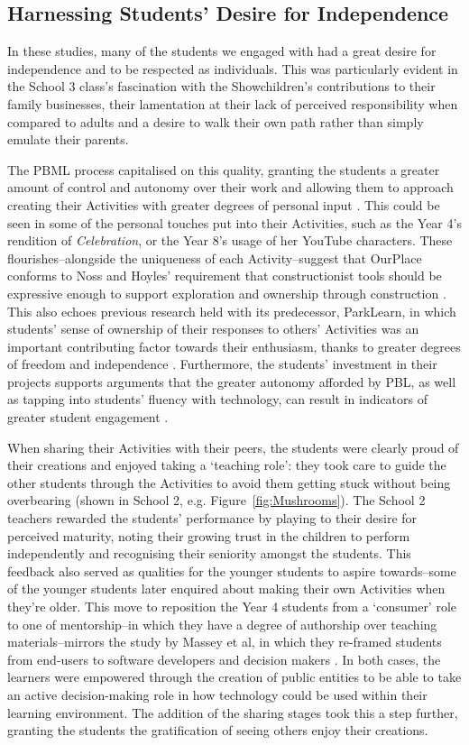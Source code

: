 \documentclass[,hyphens]{sigchi}
\begin{document}
\subsection{Harnessing Students' Desire for Independence}
In these studies, many of the students we engaged with had a great desire for independence and to be respected as individuals. This was particularly evident in the School 3 class's fascination with the Showchildren's contributions to their family businesses, their lamentation at their lack of perceived responsibility when compared to adults and a desire to walk their own path rather than simply emulate their parents.

The PBML process capitalised on this quality, granting the students a greater amount of control and autonomy over their work \cite{Noss2017, Wurdinger2007} and allowing them to approach creating their Activities with greater degrees of personal input \cite{Richardson2017}. This could be seen in some of the personal touches put into their Activities, such as the Year 4's rendition of \textit{Celebration}, or the Year 8's usage of her YouTube characters. These flourishes--alongside the uniqueness of each Activity--suggest that OurPlace conforms to Noss and Hoyles' requirement that constructionist tools should be expressive enough to support exploration and ownership through construction \cite{Noss2017}. This also echoes previous research held with its predecessor, ParkLearn, in which students' sense of ownership of their responses to others' Activities was an important contributing factor towards their enthusiasm, thanks to greater degrees of freedom and independence \cite{Richardson2018}. Furthermore, the students' investment in their projects supports arguments that the greater autonomy afforded by PBL, as well as tapping into students' fluency with technology, can result in indicators of greater student engagement \cite{Wurdinger2007, Bell2010}.

When sharing their Activities with their peers, the students were clearly proud of their creations and enjoyed taking a `teaching role': they took care to guide the other students through the Activities to avoid them getting stuck without being overbearing (shown in School 2, e.g. Figure~\ref{fig:Mushrooms}). The School 2 teachers rewarded the students' performance by playing to their desire for perceived maturity, noting their growing trust in the children to perform independently and recognising their seniority amongst the students. This feedback also served as qualities for the younger students to aspire towards--some of the younger students later enquired about making their own Activities when they're older. This move to reposition the Year 4 students from a `consumer' role to one of mentorship--in which they have a degree of authorship over teaching materials--mirrors the study by Massey et al, in which they re-framed students from end-users to software developers and decision makers \cite{Massey2006}. In both cases, the learners were empowered through the creation of public entities to be able to take an active decision-making role in how technology could be used within their learning environment. The addition of the sharing stages took this a step further, granting the students the gratification of seeing others enjoy their creations.
 
\end{document}
